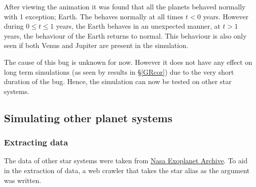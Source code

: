 \documentclass[11pt, oneside]{article}   	%
\begin{document}
After viewing the animation it was found that all the planets behaved normally with 1 exception; Earth. The behaves normally at all times $t < 0$ years. However during $0 \leq t \leq 1$ years, the Earth behaves in an unexpected manner, at $t > 1$ years, the behaviour of the Earth returns to normal.  This behaviour is also only seen if both Venus and Jupiter are present in the simulation.

The cause of this bug is unknown for now. However it does not have any effect on long term simulations (as seen by results in \S\ref{GRcor}) due to the very short duration of the bug. Hence, the simulation can now be tested on other star systems.

\subsection{Simulating other planet systems}

\subsubsection{Extracting data}


The data of other star systems were taken from \href{https://exoplanetarchive.ipac.caltech.edu/}{Nasa Exoplanet Archive}. To aid in the extraction of data, a web crawler that takes the star alias as the argument was written.
\end{document}
